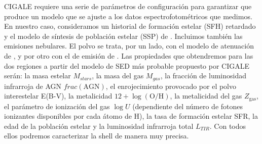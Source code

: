 CIGALE requiere una serie de parámetros de configuración para garantizar que produce un modelo que se ajuste a los datos espectrofotométricos que medimos. En nuestro caso, consideramos un historial de formación estelar (SFH) retardado y el modelo de síntesis de población estelar (SSP) de \citet{bruzualStellarPopulationSynthesis2003}. Incluimos también las emisiones nebulares. El polvo se trata, por un lado, con el modelo de atenuación de \citet{calzettiDustContentOpacity2000}, y por otro con el de emisión de \citet{daleTwoparameterModelInfrared2014}. Las propiedades que obtendremos para las dos regiones a partir del modelo de SED más probable propuesto por CIGALE serán: la masa estelar \(M_{stars}\), la masa del gas \(M_{gas}\), la fracción de luminosidad infrarroja de AGN \(frac(\text{AGN})\), el enrojecimiento provocado por el polvo interestelar E(B-V), la metalicidad \(12 + \log{(\text{O}/\text{H})}\), la metalicidad del gas \(Z_{\text{gas}}\), el parámetro de ionización del gas \(\log{U}\) (dependiente del número de fotones ionizantes disponibles por cada átomo de H), la tasa de formación estelar SFR, la edad de la población estelar y la luminosidad infrarroja total \(L_{TIR}\). Con todos ellos podremos caracterizar la shell de manera muy precisa.